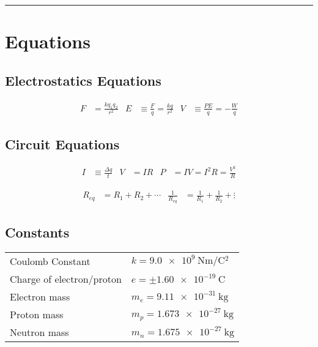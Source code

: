 \documentclass[10pt]{exam}
\begin{document}
\hrule

\section*{Equations}

\subsection*{Electrostatics Equations}

\begin{align*}
  F &= \frac{kq_1 q_2} {r^2} &
  E &\equiv \frac{F}{q} = \frac{kq}{r^2} &
  V &\equiv \frac{PE}{q} = -\frac{W}{q}
\end{align*}

\subsection*{Circuit Equations}

\begin{align*}
  I &\equiv \frac{\Delta q}{t} &
  V &= IR &
  P &= IV = I^2 R = \frac{V^2}{R}
\end{align*}


\begin{align*}
  R_{eq} &= R_1 + R_2 + \cdots &
  \frac{1}{R_{eq}} &= \frac{1}{R_1} + \frac{1}{R_2} + \vdots
\end{align*}


\subsection*{Constants}

\vspace{2em}

\begin{tabular}{ll}
Coulomb Constant          &   $k = \SI{9.0e9}{\newton\meter\per\coulomb^2}$\\
Charge of electron/proton &   $e=\pm\SI{1.60e-19}{\coulomb}$\\
Electron mass             &   $m_e=\SI{9.11e-31}{\kilo\gram}$\\
Proton mass	              &   $m_p=\SI{1.673e-27}{\kilo\gram}$\\
Neutron mass	            &   $m_n=\SI{1.675e-27}{\kilo\gram}$
\end{tabular}
\end{document}
